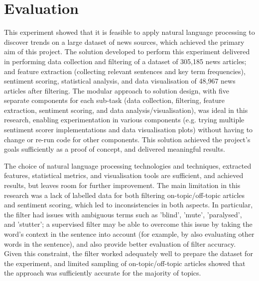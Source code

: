 \documentclass{report}
\begin{document}
\section{Evaluation} \label{Evaluation}

This experiment showed that it is feasible to apply natural language processing to discover trends on a large dataset of news sources, which achieved the primary aim of this project.
The solution developed to perform this experiment delivered in performing data collection and filtering of a dataset of 305,185 news articles; and feature extraction (collecting relevant sentences and key term frequencies), sentiment scoring, statistical analysis, and data visualisation of 48,967 news articles after filtering.
The modular approach to solution design, with five separate components for each sub-task (data collection, filtering, feature extraction, sentiment scoring, and data analysis/visualisation), was ideal in this research, enabling experimentation in various components (e.g. trying multiple sentiment scorer implementations and data visualisation plots) without having to change or re-run code for other components.
This solution achieved the project's goals sufficiently as a proof of concept, and delivered meaningful results.

The choice of natural language processing technologies and techniques, extracted features, statistical metrics, and visualisation tools are sufficient, and achieved results, but leaves room for further improvement.
The main limitation in this research was a lack of labelled data for both filtering on-topic/off-topic articles and sentiment scoring, which led to inconsistencies in both aspects.
In particular, the filter had issues with ambiguous terms such as 'blind', 'mute', 'paralysed', and 'stutter'; a supervised filter may be able to overcome this issue by taking the word's context in the sentence into account (for example, by also evaluating other words in the sentence), and also provide better evaluation of filter accuracy. 
Given this constraint, the filter worked adequately well to prepare the dataset for the experiment, and limited sampling of on-topic/off-topic articles showed that the approach was sufficiently accurate for the majority of topics.
\end{document}
